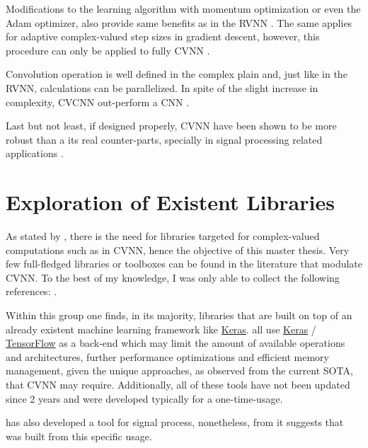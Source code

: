 Modifications to the learning algorithm with momentum optimization or even the Adam optimizer, also provide same benefits as in the \gls{RVNN} \parencite{kotsovsky2020new, kingma2014adam}. The same applies for adaptive complex-valued step sizes in gradient descent, however, this procedure can only be applied to fully \gls{CVNN} \parencite{zhao2023ortogradientcvnn, weijing2024gradientdescentcvnn}.

Convolution operation is well defined in the complex plain and, just like in the \gls{RVNN}, calculations can be parallelized. In spite of the slight increase in complexity, \gls{CVCNN} out-perform a \gls{CNN} \parencite{guberman2016complex, chatterjee2022cvnncomparison}.

Last but not least, if designed properly, \gls{CVNN}  have been shown to be more robust than a its real counter-parts, specially in signal processing related applications \parencite{neacsu2022protectcvnn}.

\section{Exploration of Existent Libraries}
As stated by \parencite{bassey2021survey}, there is the need for libraries targeted for complex-valued computations such as in \gls{CVNN}, hence the objective of this master thesis. Very few full-fledged libraries or toolboxes can be found in the literature that modulate \gls{CVNN}. To the best of my knowledge, I was only able to collect the following references: \parencite{trabelsi2017tool, cruz4252610rosenpy, peker2015tool, j_agustin_barrachina_2022_7303587, dramsch2019complex, barrachina2023theory}.

Within this group one finds, in its majority, libraries that are built on top of an already existent machine learning framework like \href{https://keras.io/}{Keras}. \parencite{trabelsi2017tool, cruz4252610rosenpy, j_agustin_barrachina_2022_7303587, dramsch2019complex, barrachina2023theory} all use \href{https://keras.io/}{Keras} / \href{https://www.tensorflow.org/}{TensorFlow} as a back-end which may limit the amount of available operations and architectures, further performance optimizations and efficient memory management, given the unique approaches, as observed from the current \gls{SOTA}, that \gls{CVNN} may require. Additionally, all of these tools have not been updated since 2 years and were developed typically for a one-time-usage.

\textcite{peker2015tool} has also developed a tool for signal process, nonetheless, from \parencite{peker2016eegsignal} it suggests that was built from this specific usage.



